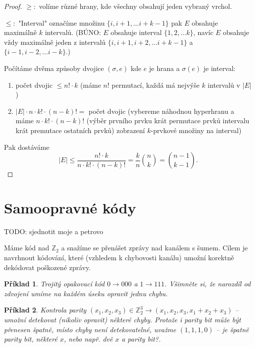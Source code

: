 \documentclass[a4paper,10pt,titlepage]{article} \usepackage[utf8]{inputenc}
\newtheorem*{example}{Příklad}
\begin{document}
\begin{proof}
$\geq :$ volíme různé hrany, kde všechny obsahují jeden vybraný vrchol.

$\leq :$ "Interval" označíme množinu $\{i,i+1,\ldots i+k-1\}$ pak $E$ obsahuje maximálně $k$ intervalů.
(BÚNO: $E$ obsahuje interval $\{1,2,\ldots k\}$, navíc $E$ obsahuje vždy maximálně jeden z intervalů 
$\{i,i+1,i+2,\ldots i+k-1\}$ a $\{i-1,i-2,\ldots i-k\}$.)

Počítáme dvěma způsoby dvojice $(\sigma,e)$ kde $e$ je hrana a $\sigma(e)$ je interval:
\begin{enumerate}
\item počet dvojic $\leq n! \cdot k$ (máme $n!$ permutací, každá má nejvýše $k$ intervalů v $|E|$)
\item $|E| \cdot n \cdot k! \cdot (n-k)! = $ počet dvojic
	(vybereme náhodnou hyperhranu a máme $n \cdot k! \cdot (n-k)!$ (výběr prvního prvku krát permutace prvků intervalu krát
	premutace ostatních prvků) zobrazení $k$-prvkové množiny na interval)
\end{enumerate}
Pak dostáváme 
\[
	|E| \leq \frac{n! \cdot k}{ n \cdot k! \cdot (n-k)!} = \frac{k}{n}\binom{n}{k} = \binom{n-1}{k-1}.
\]
\end{proof}

\medskip

\section{Samoopravné kódy}
TODO: sjednotit moje a petrovo

Máme kód nad $\mathbb{Z}_2$ a snažíme se přenášet zprávy nad kanálem s šumem. Cílem je navrhnout kódování, které (vzhledem k chybovosti kanálu) umožní korektně dekódovat poškozené zprávy.

\begin{example}
Trojitý opakovací kód $0 \rightarrow 000$ a $1 \rightarrow 111$. Všimněte si, že narozdíl od zdvojení umíme na každém úseku opravit jednu chybu.
\end{example}

\begin{example}
Kontrola parity $(x_1,x_2,x_3) \in \mathbb{Z}_2^3 \rightarrow (x_1,x_2,x_3,x_1+x_2+x_3)$ -- umožní detekovat (nikoliv opravit) některé chyby. Protože i parity bit může být přenesen špatně, místo chyby není detekovatelné, uvažme $(1, 1, 1, 0)$ -- je špatně parity bit, některé $x$, nebo např. dvě $x$ a parity bit?.
\end{example}
\end{document}
